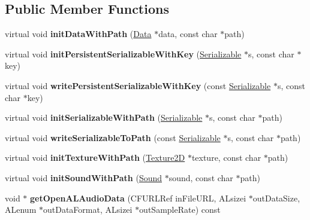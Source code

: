 \subsection*{Public Member Functions}
\begin{DoxyCompactItemize}
\item 
\hypertarget{classg2c_1_1_mac_bank_ad5db791743a30e7d2a82ac585c053eb5}{
virtual void {\bfseries initDataWithPath} (\hyperlink{classg2c_1_1_data}{Data} $\ast$data, const char $\ast$path)}
\label{classg2c_1_1_mac_bank_ad5db791743a30e7d2a82ac585c053eb5}

\item 
\hypertarget{classg2c_1_1_mac_bank_a2432781fb7eab72f72da1a12c9ac6f34}{
virtual void {\bfseries initPersistentSerializableWithKey} (\hyperlink{classg2c_1_1_serializable}{Serializable} $\ast$s, const char $\ast$key)}
\label{classg2c_1_1_mac_bank_a2432781fb7eab72f72da1a12c9ac6f34}

\item 
\hypertarget{classg2c_1_1_mac_bank_aba4c0168c570a4e9ae53a63b71285895}{
virtual void {\bfseries writePersistentSerializableWithKey} (const \hyperlink{classg2c_1_1_serializable}{Serializable} $\ast$s, const char $\ast$key)}
\label{classg2c_1_1_mac_bank_aba4c0168c570a4e9ae53a63b71285895}

\item 
\hypertarget{classg2c_1_1_mac_bank_a5d99c78e0394b7b1ddf9c3e0e6fae06d}{
virtual void {\bfseries initSerializableWithPath} (\hyperlink{classg2c_1_1_serializable}{Serializable} $\ast$s, const char $\ast$path)}
\label{classg2c_1_1_mac_bank_a5d99c78e0394b7b1ddf9c3e0e6fae06d}

\item 
\hypertarget{classg2c_1_1_mac_bank_aa413ee0530ef972b84d583520b12f8d7}{
virtual void {\bfseries writeSerializableToPath} (const \hyperlink{classg2c_1_1_serializable}{Serializable} $\ast$s, const char $\ast$path)}
\label{classg2c_1_1_mac_bank_aa413ee0530ef972b84d583520b12f8d7}

\item 
\hypertarget{classg2c_1_1_mac_bank_aa9091012006c18ada89c0271b2f16bed}{
virtual void {\bfseries initTextureWithPath} (\hyperlink{classg2c_1_1_texture2_d}{Texture2D} $\ast$texture, const char $\ast$path)}
\label{classg2c_1_1_mac_bank_aa9091012006c18ada89c0271b2f16bed}

\item 
\hypertarget{classg2c_1_1_mac_bank_a3d43d417db99484f03e091fc1e378160}{
virtual void {\bfseries initSoundWithPath} (\hyperlink{classg2c_1_1_sound}{Sound} $\ast$sound, const char $\ast$path)}
\label{classg2c_1_1_mac_bank_a3d43d417db99484f03e091fc1e378160}

\item 
\hypertarget{classg2c_1_1_mac_bank_a8a934716f7bfdc914fd42bcf48a2c17a}{
void $\ast$ {\bfseries getOpenALAudioData} (CFURLRef inFileURL, ALsizei $\ast$outDataSize, ALenum $\ast$outDataFormat, ALsizei $\ast$outSampleRate) const }
\label{classg2c_1_1_mac_bank_a8a934716f7bfdc914fd42bcf48a2c17a}

\end{DoxyCompactItemize}
